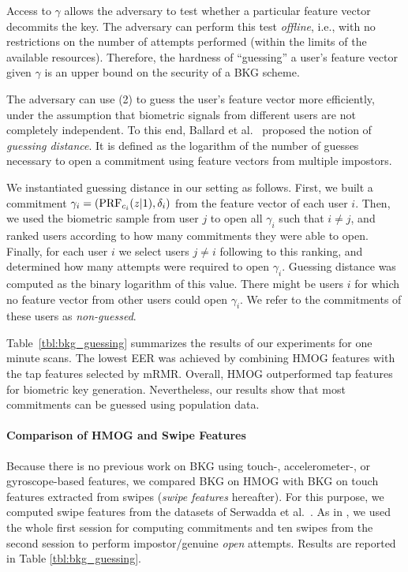 Access to $\gamma$ allows the adversary to test whether a particular feature 
vector decommits the key. The adversary can perform this test {\em offline}, 
i.e., with no restrictions on the number of attempts performed (within the limits of the available resources). Therefore, the hardness of ``guessing'' a user's feature vector given 
$\gamma$ is an upper bound on the security of a BKG scheme. 

The adversary can use (2) to guess the user's feature vector more efficiently, 
under the assumption that biometric signals from different users are not 
completely independent. To this end, Ballard et al.~\cite{bal08} proposed the notion 
of \emph{guessing distance}. It is defined as the logarithm of the number of 
guesses necessary to open a 
commitment using feature vectors from multiple impostors.

We instantiated guessing distance in our setting as follows. First, we built a 
commitment $\gamma_i=(\operatorname{PRF}_{c_i}(z|1), \delta_i)$ from the feature vector 
of each user $i$. Then, we used the biometric sample from user $j$ to open all $
\gamma_i$ such that $i\neq j$, and ranked users according to how many 
commitments they were able to open.  Finally, for each user $i$ we select users 
$j\neq i$ following to this ranking, and determined how many attempts were 
required to open $\gamma_i$. Guessing distance was computed as the binary 
logarithm of this value.
%
There might be users $i$ for which no feature vector from other users could open 
$\gamma_i$. We refer to the commitments of these users as {\em non-guessed}.

Table~\ref{tbl:bkg_guessing} summarizes the results of our experiments for one 
minute scans. The lowest EER was achieved by combining HMOG features 
with the tap features selected by mRMR. Overall, HMOG outperformed tap 
features for biometric key generation. Nevertheless, our results show that most 
commitments can be guessed using population data. 

\paragraph{Comparison of HMOG and Swipe Features}
Because there is no previous work on BKG using touch-, accelerometer-, or gyroscope-based features, we compared BKG on HMOG with BKG on touch features extracted from swipes ({\em swipe features} hereafter). For this purpose, we computed swipe features from the datasets of Serwadda et al.~\cite{serwadda2013}. As in \cite{serwadda2013}, we used the whole first session for computing commitments and ten swipes from the second session to perform impostor/genuine {\em open} attempts. 
%
Results are reported in Table \ref{tbl:bkg_guessing}. 

